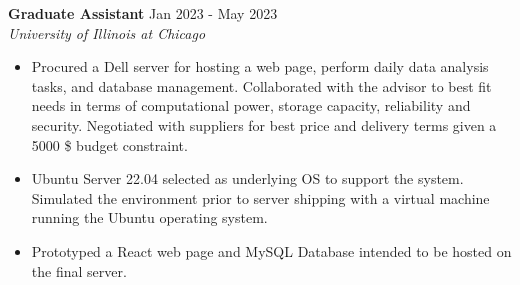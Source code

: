 
\noindent
\textbf{Graduate Assistant} \hfill Jan 2023 - May 2023 \\
\textit{University of Illinois at Chicago}
\begin{itemize}[noitemsep,topsep=0pt]
    \item Procured a Dell server for hosting a web page, perform daily data analysis tasks, and database management. Collaborated with the advisor to best fit needs in terms of computational power, storage capacity, reliability and security. Negotiated with suppliers for best price and delivery terms given a 5000 \$ budget constraint.
    \item Ubuntu Server 22.04 selected as underlying OS to support the system. Simulated the environment prior to server shipping with a virtual machine running the Ubuntu operating system.
    \item Prototyped a React web page and MySQL Database intended to be hosted on the final server.
\end{itemize}

